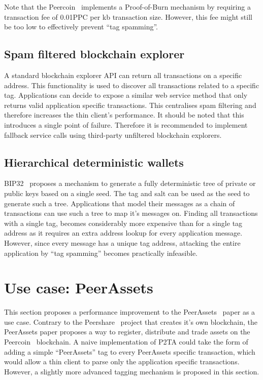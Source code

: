 \documentclass[a4paper,10pt]{article}
\begin{document}
Note that the Peercoin~\cite{King12} implements a Proof-of-Burn mechanism by requiring a transaction fee of 0.01PPC per kb transaction size.
However, this fee might still be too low to effectively prevent ``tag spamming''.

\subsection{Spam filtered blockchain explorer}
A standard blockchain explorer API can return all transactions on a specific address.
This functionality is used to discover all transactions related to a specific tag.
Applications can decide to expose a similar web service method that only returns valid application specific transactions.
This centralises spam filtering and therefore increases the thin client's performance.
It should be noted that this introduces a single point of failure.
Therefore it is recommended to implement fallback service calls using third-party unfiltered blockchain explorers.

\subsection{Hierarchical deterministic wallets}
BIP32~\cite{Wui12} proposes a mechanism to generate a fully deterministic tree of private or public keys based on a single seed.
The tag and salt can be used as the seed to generate such a tree.
Applications that model their messages as a chain of transactions can use such a tree to map it's messages on.
Finding all transactions with a single tag, becomes considerably more expensive than for a single tag address as it requires an extra address lookup for every application message.
However, since every message has a unique tag address, attacking the entire application by ``tag spamming'' becomes practically infeasible.


\section{Use case: PeerAssets}
This section proposes a performance improvement to the PeerAssets~\cite{Pchem} paper as a use case.
Contrary to the Peershare~\cite{Lee13} project that creates it's own blockchain, the PeerAssets paper proposes a way to register, distribute and trade assets on the Peercoin~\cite{King12} blockchain.
A naive implementation of P2TA could take the form of adding a simple ``PeerAssets'' tag to every PeerAssets specific transaction, which would allow a thin client to parse only the application specific transactions.
However, a slightly more advanced tagging mechanism is proposed in this section.
\end{document}
